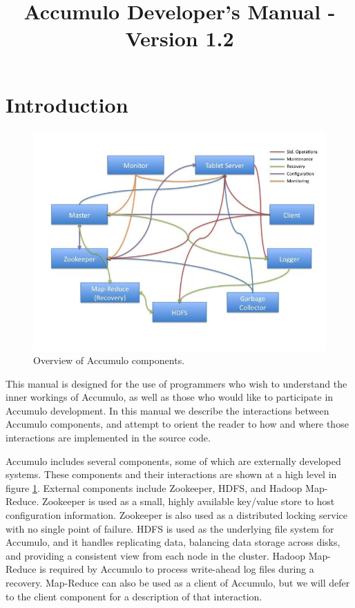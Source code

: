 \documentclass[letterpaper,onecolumn,12pt,titlepage]{article}
\title{Accumulo Developer's Manual - Version 1.2}
\author{}
\begin{document}
\maketitle
\newpage
\tableofcontents
\newpage
\section{Introduction}

\begin{figure}[htbp]
\center
\includegraphics[scale=.6]{images/component_overview.jpg}
\caption{\label{fig_overview} Overview of Accumulo components.}
\end{figure}
This manual is designed for the use of programmers who wish to understand the inner workings of Accumulo, as well as those who would like to participate in Accumulo development.
In this manual we describe the interactions between Accumulo components, and attempt to orient the reader to how and where those interactions are implemented in the source code.

Accumulo includes several components, some of which are externally developed systems.
These components and their interactions are shown at a high level in figure \ref{fig_overview}.
External components include Zookeeper, HDFS, and Hadoop Map-Reduce.
Zookeeper is used as a small, highly available key/value store to host configuration information.
Zookeeper is also used as a distributed locking service with no single point of failure.
HDFS is used as the underlying file system for Accumulo, and it handles replicating data, balancing data storage across disks, and providing a consistent view from each node in the cluster.
Hadoop Map-Reduce is required by Accumulo to process write-ahead log files during a recovery.
Map-Reduce can also be used as a client of Accumulo, but we will defer to the client component for a description of that interaction.
\end{document}
